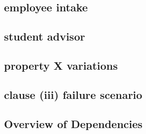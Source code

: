 \documentclass[10pt,a4paper]{scrartcl}
\begin{document}
\subsection{employee intake}





\subsection{student advisor}


\subsection{property X variations}


\subsection{clause (iii) failure scenario}


\begin{landscape}
\section{Overview of Dependencies}

\end{landscape}

 

\printindex[definitions]

\printindex[lemmas]
	 
\end{document}
